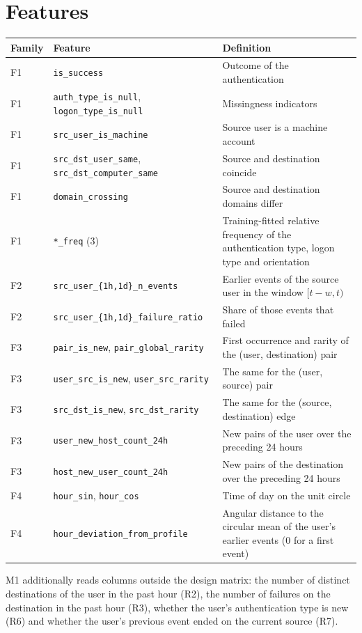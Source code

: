 \documentclass[11pt,a4paper]{article}
\begin{document}
\section{Features}
\label{app:features}
\begin{table}[H]
\centering
\footnotesize
\begin{tabular}{@{}llp{6.4cm}@{}}
\toprule
Family & Feature & Definition \\
\midrule
F1 & \texttt{is\_success} & Outcome of the authentication \\
F1 & \texttt{auth\_type\_is\_null}, \texttt{logon\_type\_is\_null} & Missingness indicators \\
F1 & \texttt{src\_user\_is\_machine} & Source user is a machine account \\
F1 & \texttt{src\_dst\_user\_same}, \texttt{src\_dst\_computer\_same} & Source and destination coincide \\
F1 & \texttt{domain\_crossing} & Source and destination domains differ \\
F1 & \texttt{*\_freq} (3) & Training-fitted relative frequency of the authentication type, logon type and orientation \\
F2 & \texttt{src\_user\_\{1h,1d\}\_n\_events} & Earlier events of the source user in the window $[t-w, t)$ \\
F2 & \texttt{src\_user\_\{1h,1d\}\_failure\_ratio} & Share of those events that failed \\
F3 & \texttt{pair\_is\_new}, \texttt{pair\_global\_rarity} & First occurrence and rarity of the (user, destination) pair \\
F3 & \texttt{user\_src\_is\_new}, \texttt{user\_src\_rarity} & The same for the (user, source) pair \\
F3 & \texttt{src\_dst\_is\_new}, \texttt{src\_dst\_rarity} & The same for the (source, destination) edge \\
F3 & \texttt{user\_new\_host\_count\_24h} & New pairs of the user over the preceding 24 hours \\
F3 & \texttt{host\_new\_user\_count\_24h} & New pairs of the destination over the preceding 24 hours \\
F4 & \texttt{hour\_sin}, \texttt{hour\_cos} & Time of day on the unit circle \\
F4 & \texttt{hour\_deviation\_from\_profile} & Angular distance to the circular mean of the user's earlier events (0 for a first event) \\
\bottomrule
\end{tabular}
\end{table}
M1 additionally reads columns outside the design matrix: the number of distinct destinations of the user in the past hour (R2), the number of failures on the destination in the past hour (R3), whether the user's authentication type is new (R6) and whether the user's previous event ended on the current source (R7).
\end{document}
